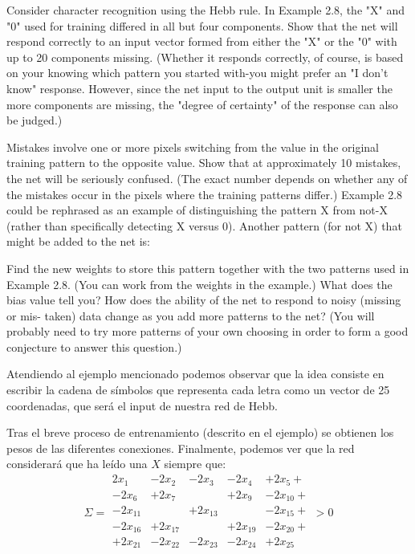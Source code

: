 \begin{problem}[3]
\ppart Consider character recognition using the Hebb rule. In Example 2.8, the "X" and
"0" used for training differed in all but four components. Show that the net will
respond correctly to an input vector formed from either the "X" or the "0" with
up to 20 components missing. (Whether it responds correctly, of course, is based on
your knowing which pattern you started with-you might prefer an "I don't know"
response. However, since the net input to the output unit is smaller the more components are missing, the "degree of certainty" of the response can also be judged.)

\ppart Mistakes involve one or more pixels switching from the value in the original
training pattern to the opposite value. Show that at approximately 10 mistakes, the
net will be seriously confused. (The exact number depends on whether any of the
mistakes occur in the pixels where the training patterns differ.)
Example 2.8 could be rephrased as an example of distinguishing the pattern X
from not-X (rather than specifically detecting X versus 0). Another pattern (for not X) that might be added to the net is:

\begin{center}
\end{center}

\ppart Find the new weights to store this pattern together with the two patterns used in
Example 2.8. (You can work from the weights in the example.) What does the bias
value tell you? How does the ability of the net to respond to noisy (missing or mis-
taken) data change as you add more patterns to the net? (You will probably need to
try more patterns of your own choosing in order to form a good conjecture to answer
this question.)

\solution


Atendiendo al ejemplo mencionado podemos observar que la idea consiste en escribir la cadena de símbolos que representa cada letra como un vector de 25 coordenadas, que será el input de nuestra red de Hebb.

Tras el breve proceso de entrenamiento (descrito en el ejemplo) se obtienen los pesos de las diferentes conexiones. Finalmente, podemos ver que la red considerará que ha leído una $X$ siempre que:
\[Σ = \begin{array}{ccccc}
2x_1& -2x_2 & -2x_3 & -2x_4 & +2x_5 +\\
-2x_6 & + 2x_7 &  & + 2x_9 &- 2x_{10} +\\
-2x_{11} & & +2x_{13} & & -2x_{15} + \\
-2x_{16} & +2x_{17} & & +2x_{19} & -2x_{20} + \\
+2x_{21} & -2x_{22} & -2x_{23} & -2x_{24} & +2x_{25} \\
\end{array} > 0\]


\end{problem}
